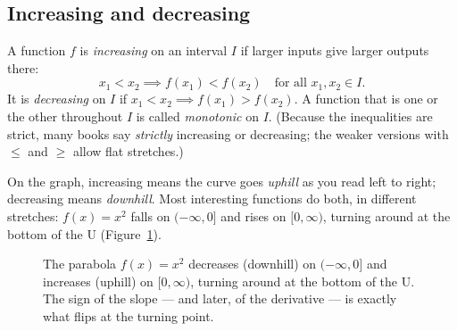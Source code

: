 \subsection{Increasing and decreasing}

\begin{definition}
\label{ch02:def-monotone}
A function $f$ is \emph{increasing} on an interval $I$ if larger inputs give larger
outputs there:
\[
  x_1 < x_2 \implies f(x_1) < f(x_2) \quad\text{for all } x_1, x_2 \in I.
\]
It is \emph{decreasing} on $I$ if $x_1 < x_2 \implies f(x_1) > f(x_2)$. A function
that is one or the other throughout $I$ is called \emph{monotonic} on $I$.
(Because the inequalities are strict, many books say \emph{strictly} increasing
or decreasing; the weaker versions with $\le$ and $\ge$ allow flat stretches.)
\end{definition}

On the graph, increasing means the curve goes \emph{uphill} as you read left to
right; decreasing means \emph{downhill}. Most interesting functions do both, in
different stretches: $f(x)=x^2$ falls on $(-\infty,0]$ and rises on $[0,\infty)$,
turning around at the bottom of the U (Figure~\ref{ch02:fig-monotonicity}).

\begin{figure}[htbp]
\centering
{}
\caption{The parabola $f(x)=x^2$ decreases (downhill) on $(-\infty,0]$ and
increases (uphill) on $[0,\infty)$, turning around at the bottom of the U. The
sign of the slope --- and later, of the derivative --- is exactly what flips at the
turning point.}
\label{ch02:fig-monotonicity}
\end{figure}

